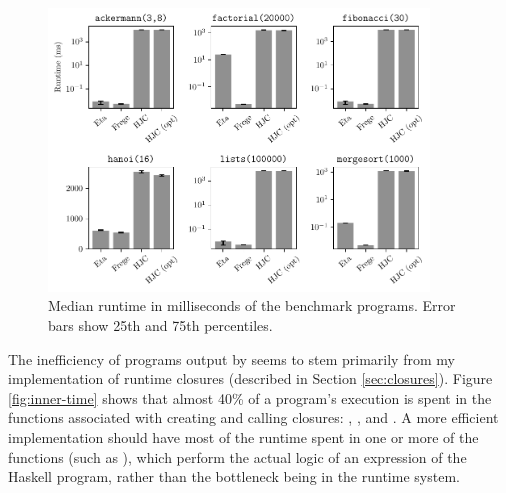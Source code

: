 \documentclass[dissertation.tex]{subfiles}
\begin{document}
{{        \begin{figure}[h]
            \centering
            \captionsetup{width=0.8\textwidth}
            \includegraphics[width=0.9\textwidth]{graphs/perf.pdf}
            \caption{Median runtime in milliseconds of the benchmark programs. Error bars show 25th and 75th percentiles.}
            \label{fig:perf}

        \end{figure}

        The inefficiency of programs output by \compilername seems to stem primarily from my implementation of runtime closures (described in Section \ref{sec:closures}). Figure \ref{fig:inner-time} shows that almost 40\% of a program's execution is spent in the functions associated with creating and calling closures: , , and . A more efficient implementation should have most of the runtime spent in one or more of the  functions (such as ), which perform the actual logic of an expression of the Haskell program, rather than the bottleneck being in the runtime system.

}}
\end{document}
